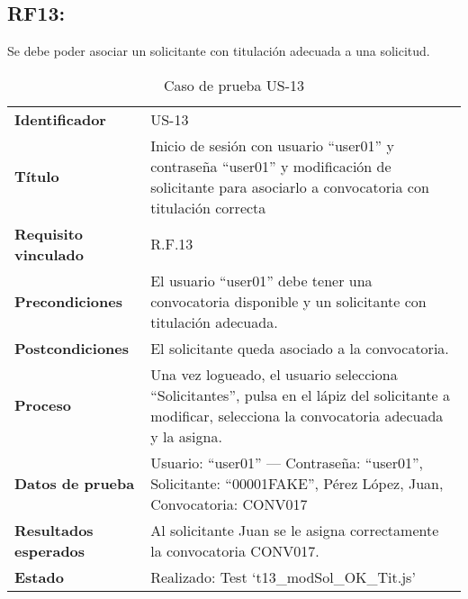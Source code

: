 \subsection*{RF13:} Se debe poder asociar un solicitante con titulación adecuada a una solicitud.
\begin{table}[H]
	\centering
	\small
	\caption{Caso de prueba US-13}
	\label{tab:caso_uso13}
	\begin{tabular}{>{\bfseries}l p{11cm}}
		Identificador & US-13 \\
		Título & Inicio de sesión con usuario “user01” y contraseña “user01” y modificación de solicitante para asociarlo a convocatoria con titulación correcta \\
		Requisito vinculado & R.F.13 \\
		Precondiciones & El usuario “user01” debe tener una convocatoria disponible y un solicitante con titulación adecuada. \\
		Postcondiciones & El solicitante queda asociado a la convocatoria. \\
		Proceso & Una vez logueado, el usuario selecciona “Solicitantes”, pulsa en el lápiz del solicitante a modificar, selecciona la convocatoria adecuada y la asigna. \\
		Datos de prueba & Usuario: “user01” — Contraseña: “user01”, Solicitante: “00001FAKE”, Pérez López, Juan, Convocatoria: CONV017 \\
		Resultados esperados & Al solicitante Juan se le asigna correctamente la convocatoria CONV017. \\
		Estado & Realizado: Test `t13\_modSol\_OK\_Tit.js' \\
	\end{tabular}
\end{table}



